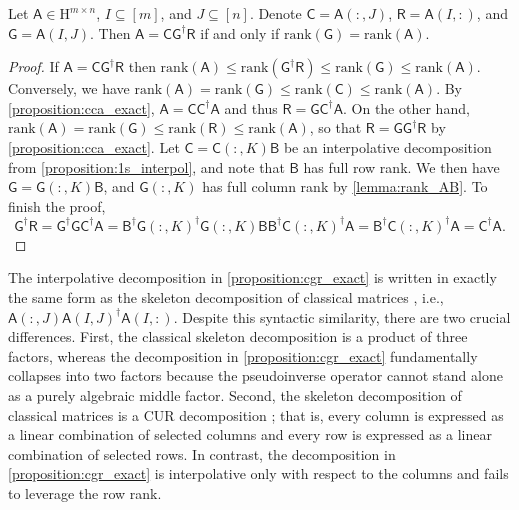 \documentclass[onefignum,onetabnum]{siamart250211}
\renewenvironment{equation*}{\[}{\]\ignorespacesafterend}
\newcommand{\Hilb}{\mathrm{H}}
\newcommand{\Batrix}[1]{\bm{\Matrix{#1}}}
\newcommand{\Matrix}[1]{\mathsf{#1}}
\newcommand{\pinv}{\dagger}
\newcommand{\rank}[2][]{\mathrm{rank} #1( #2 #1)}
\newcommand{\Index}[1]{{#1}}
\begin{document}
\begin{proposition}
\label{proposition:cgr_exact}
Let $\Batrix{A} \in \Hilb^{m \times n}$, $\Index{I} \subseteq [m]$, and $\Index{J} \subseteq [n]$.
Denote $\Batrix{C} = \Batrix{A}(:, \Index{J})$, $\Batrix{R} = \Batrix{A}(\Index{I}, :)$, and $\Batrix{G} = \Batrix{A}(\Index{I}, \Index{J})$.
Then $\Batrix{A} = \Batrix{C} \Batrix{G}^{\pinv} \Batrix{R}$ if and only if $\rank{\Batrix{G}} = \rank{\Batrix{A}}$.
\end{proposition}
\begin{proof}
If $\Batrix{A} = \Batrix{C} \Batrix{G}^\pinv \Batrix{R}$ then $\rank{\Batrix{A}} \leq \rank{\Batrix{G}^\pinv \Batrix{R}} \leq \rank{\Batrix{G}} \leq \rank{\Batrix{A}}$.
Conversely, we have $\rank{\Batrix{A}} = \rank{\Batrix{G}} \leq \rank{\Batrix{C}} \leq \rank{\Batrix{A}}$.
By \cref{proposition:cca_exact}, $\Batrix{A} = \Batrix{C} \Batrix{C}^\pinv \Batrix{A}$ and thus $\Batrix{R} = \Batrix{G} \Batrix{C}^\pinv \Batrix{A}$.
On the other hand, $\rank{\Batrix{A}} = \rank{\Batrix{G}} \leq \rank{\Batrix{R}} \leq \rank{\Batrix{A}}$, so that $\Batrix{R} = \Batrix{G} \Batrix{G}^\pinv \Batrix{R}$ by \cref{proposition:cca_exact}.
Let $\Batrix{C} = \Batrix{C}(:, \Index{K}) \Matrix{B}$ be an interpolative decomposition from \cref{proposition:1s_interpol}, and note that $\Matrix{B}$ has full row rank.
We then have $\Batrix{G} = \Batrix{G}(:, \Index{K}) \Matrix{B}$, and $\Batrix{G}(:, \Index{K})$ has full column rank by \cref{lemma:rank_AB}.
To finish the proof,
\begin{equation*}
    \Batrix{G}^\pinv \Batrix{R} = \Batrix{G}^\pinv \Batrix{G} \Batrix{C}^\pinv \Batrix{A} = \Matrix{B}^\pinv \Batrix{G}(:, \Index{K})^\pinv \Batrix{G}(:, \Index{K}) \Matrix{B} \Matrix{B}^\pinv \Batrix{C}(:, \Index{K})^\pinv \Batrix{A} = \Matrix{B}^\pinv \Batrix{C}(:, \Index{K})^\pinv \Batrix{A} = \Batrix{C}^\pinv \Batrix{A}.
\end{equation*}
\end{proof}

The interpolative decomposition in \cref{proposition:cgr_exact} is written in exactly the same form as the skeleton decomposition of classical matrices \cite{goreinov1997theory}, i.e., $\Matrix{A}(:, \Index{J}) \Matrix{A}(\Index{I}, \Index{J})^{\pinv} \Matrix{A}(\Index{I}, :)$.
Despite this syntactic similarity, there are two crucial differences.
First, the classical skeleton decomposition is a product of three factors, whereas the decomposition in \cref{proposition:cgr_exact} fundamentally collapses into two factors because the pseudoinverse operator cannot stand alone as a purely algebraic middle factor.
Second, the skeleton decomposition of classical matrices is a CUR decomposition \cite{hamm2020perspectives}; that is, every column is expressed as a linear combination of selected columns and every row is expressed as a linear combination of selected rows.
In contrast, the decomposition in \cref{proposition:cgr_exact} is interpolative only with respect to the columns and fails to leverage the row rank.
\end{document}
